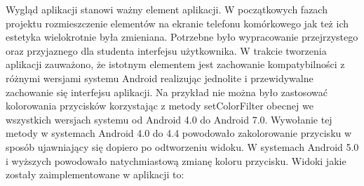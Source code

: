 \documentclass{report}
\begin{document}
		Wygląd aplikacji stanowi ważny element aplikacji. W początkowych fazach projektu rozmieszczenie elementów na ekranie telefonu komórkowego jak też ich estetyka wielokrotnie była zmieniana. Potrzebne było wypracowanie przejrzystego oraz przyjaznego dla studenta interfejsu użytkownika. W trakcie tworzenia aplikacji zauważono, że istotnym elementem jest zachowanie kompatybilności z różnymi wersjami systemu Android realizując jednolite i przewidywalne zachowanie się interfejsu aplikacji.
		Na przykład nie można było zastosować kolorowania przycisków korzystając z metody setColorFilter obecnej we wszystkich wersjach systemu od Android 4.0 do Android 7.0. Wywołanie tej metody w systemach Android 4.0 do 4.4 powodowało zakolorowanie przycisku w sposób ujawniający się dopiero po odtworzeniu widoku. W systemach Android 5.0 i wyższych powodowało natychmiastową zmianę koloru przycisku.
		Widoki jakie zostały zaimplementowane w aplikacji to:
\end{document}
